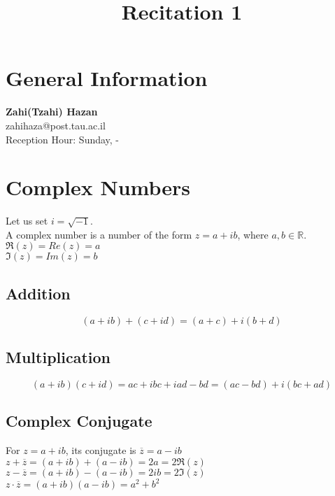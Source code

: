 \documentclass[fleqn]{article}
\title{Recitation 1}
\author{}
\date{\formatdate{29}{10}{2014}}
\begin{document}
\maketitle
\setlength{\mathindent}{0pt}

\tableofcontents

\newpage
\section{General Information}

\textbf{Zahi(Tzahi) Hazan}\\
zahihaza@post.tau.ac.il\\
Reception Hour: Sunday,  - \\

\newpage
\section{Complex Numbers}

Let us set $i = \sqrt{-1}$. \\
A complex number is a number of the form $z = a + ib$, where $a, b \in \mathbb{R}$.\\
$\Re(z) = Re(z) = a$\\
$\Im(z) = Im(z) = b$\\

\subsection{Addition}

\[(a + ib) + (c + id) = (a + c) + i(b + d)\]

\subsection{Multiplication}

\[(a + ib)(c + id) = ac + ibc + iad - bd = (ac - bd) + i(bc + ad)\]

\subsection{Complex Conjugate}

For $z = a + ib$, its conjugate is $\overline{z} = a - ib$\\
$z + \overline{z} = (a + ib) + (a - ib) = 2a = 2\Re(z)$\\
$z - \overline{z} = (a + ib) - (a - ib) = 2ib = 2\Im(z)$\\
$z \cdot \overline{z} = (a + ib) (a - ib) = a^2 + b^2$\\
\end{document}
